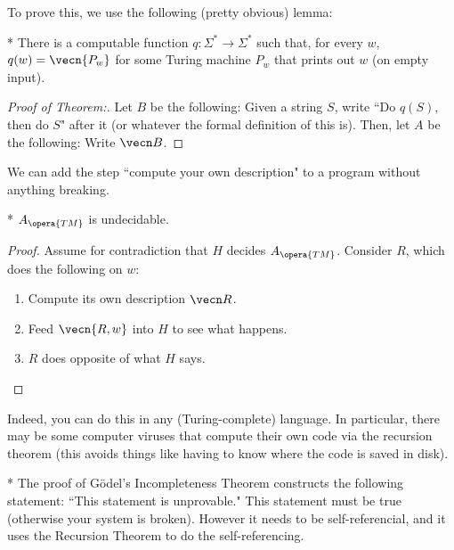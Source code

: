 To prove this, we use the following (pretty obvious) lemma:

\begin{lem}*
	There is a computable function $q\colon \Sigma^* \to \Sigma^*$ such that, for every $w$, $q(w) = \vecn{P_w}$ for some Turing machine $P_w$ that prints out $w$ (on empty input).
\end{lem}

\begin{proof}
	[Proof of Theorem:]
	Let $B$ be the following: Given a string $S$, write ``Do $q(S)$, then do $S$" after it (or whatever the formal definition of this is).
	Then, let $A$ be the following: Write $\vecn B$.
\end{proof}

\begin{thm}
	We can add the step ``compute your own description" to a program without anything breaking.
\end{thm}

\begin{cor}*
	$A_{\opera{TM}}$ is undecidable.
\end{cor}

\begin{proof}
	Assume for contradiction that $H$ decides $A_{\opera{TM}}$.
	Consider $R$, which does the following on $w$:
	\begin{enumerate}
		\item Compute its own description $\vecn R$.
		\item Feed $\vecn{R,w}$ into $H$ to see what happens.
		\item $R$ does opposite of what $H$ says.
	\end{enumerate}
\end{proof}

Indeed, you can do this in any (Turing-complete) language.
In particular, there may be some computer viruses that compute their own code via the recursion theorem (this avoids things like having to know where the code is saved in disk).

\begin{fact}*
	The proof of G\"odel's Incompleteness Theorem constructs the following statement: ``This statement is unprovable." This statement must be true (otherwise your system is broken). However it needs to be self-referencial, and it uses the Recursion Theorem to do the self-referencing.
\end{fact}
